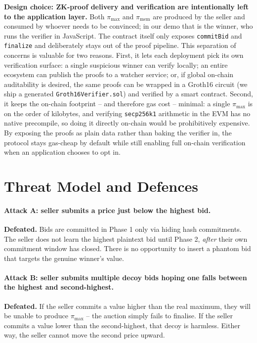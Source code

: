\documentclass[11pt,a4paper]{article}
\begin{document}
\textbf{Design choice: ZK-proof delivery and verification are intentionally
left to the application layer.} Both $\pi_{\max}$ and $\pi_{\mathrm{mem}}$
are produced by the seller and consumed by whoever needs to be convinced;
in our demo that is the winner, who runs the verifier in JavaScript. The
contract itself only exposes \texttt{commitBid} and \texttt{finalize} and
deliberately stays out of the proof pipeline. This separation of concerns
is valuable for two reasons. First, it lets each deployment pick its own
verification surface: a single suspicious winner can verify locally; an
entire ecosystem can publish the proofs to a watcher service; or, if global
on-chain auditability is desired, the same proofs can be wrapped in a
Groth16 circuit (we ship a generated \texttt{Groth16Verifier.sol}) and
verified by a smart contract. Second, it keeps the on-chain footprint --
and therefore gas cost -- minimal: a single $\pi_{\max}$ is on the order
of kilobytes, and verifying \texttt{secp256k1} arithmetic in the EVM has
no native precompile, so doing it directly on-chain would be prohibitively
expensive. By exposing the proofs as plain data rather than baking the
verifier in, the protocol stays gas-cheap by default while still enabling
full on-chain verification when an application chooses to opt in.

\section{Threat Model and Defences}

\paragraph{Attack A: seller submits a price just below the highest bid.}
\textbf{Defeated.} Bids are committed in Phase 1 only via hiding hash
commitments. The seller does not learn the highest plaintext bid until Phase 2,
\emph{after} their own commitment window has closed. There is no opportunity
to insert a phantom bid that targets the genuine winner's value.

\paragraph{Attack B: seller submits multiple decoy bids hoping one falls
between the highest and second-highest.}
\textbf{Defeated.} If the seller commits a value higher than the real maximum,
they will be unable to produce $\pi_{\max}$ -- the auction simply fails to
finalise. If the seller commits a value lower than the second-highest, that
decoy is harmless. Either way, the seller cannot move the second price upward.
\end{document}
